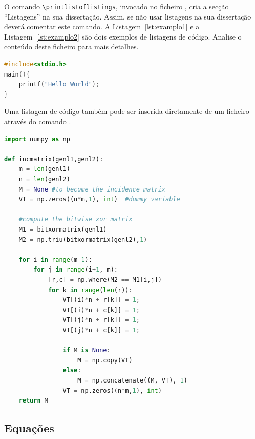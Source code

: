 O comando \verb|\printlistoflistings|, invocado no ficheiro , cria a secção ``Listagens'' na sua dissertação. Assim, se não usar listagens na sua dissertação deverá comentar este comando. A Listagem~\ref{lst:examplo1} e a Listagem~\ref{lst:examplo2} são dois exemplos de listagens de código. Analise o conteúdo deste ficheiro para mais detalhes.

\begin{center}
\begin{minipage}{0.7\linewidth}
\begin{lstlisting}[language=C, caption=Exemplo simples de C., label=lst:examplo1]
#include<stdio.h>
main(){
	printf("Hello World");
}
\end{lstlisting}
\end{minipage}
\end{center}

Uma listagem de código também pode ser inserida diretamente de um ficheiro através do comando \verb||.

\begin{minipage}{0.9\linewidth}
\begin{lstlisting}[language=Python, caption=Exemplo longo em Python., label=lst:examplo2]
import numpy as np
    
def incmatrix(genl1,genl2):
    m = len(genl1)
    n = len(genl2)
    M = None #to become the incidence matrix
    VT = np.zeros((n*m,1), int)  #dummy variable
    
    #compute the bitwise xor matrix
    M1 = bitxormatrix(genl1)
    M2 = np.triu(bitxormatrix(genl2),1) 

    for i in range(m-1):
        for j in range(i+1, m):
            [r,c] = np.where(M2 == M1[i,j])
            for k in range(len(r)):
                VT[(i)*n + r[k]] = 1;
                VT[(i)*n + c[k]] = 1;
                VT[(j)*n + r[k]] = 1;
                VT[(j)*n + c[k]] = 1;
                
                if M is None:
                    M = np.copy(VT)
                else:
                    M = np.concatenate((M, VT), 1)               
                VT = np.zeros((n*m,1), int)  
    return M
\end{lstlisting}
\end{minipage}



\subsection{Equações}

